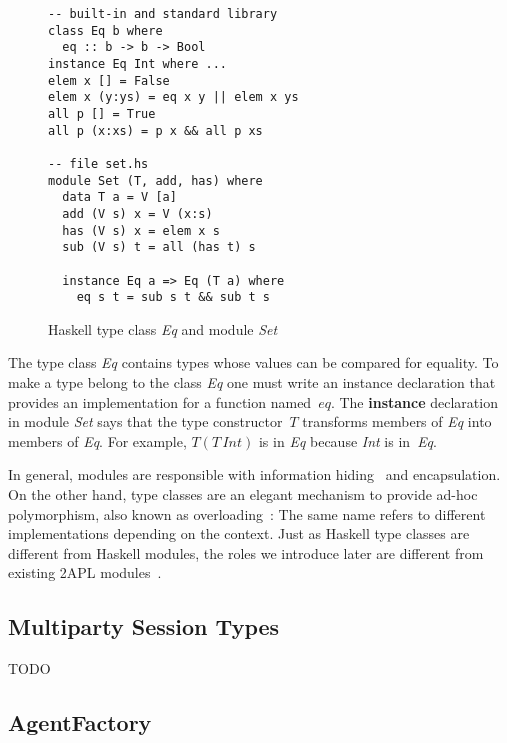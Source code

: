\documentclass[a4paper,12pt,oneside,fleqn]{book} %
\theoremstyle{plain}
\theoremstyle{definition}
\theoremstyle{remark}
\begin{document}
\begin{figure}\footnotesize %
\begin{verbatim}
-- built-in and standard library
class Eq b where
  eq :: b -> b -> Bool
instance Eq Int where ...
elem x [] = False
elem x (y:ys) = eq x y || elem x ys
all p [] = True
all p (x:xs) = p x && all p xs

-- file set.hs
module Set (T, add, has) where
  data T a = V [a]
  add (V s) x = V (x:s)
  has (V s) x = elem x s
  sub (V s) t = all (has t) s

  instance Eq a => Eq (T a) where
    eq s t = sub s t && sub t s
\end{verbatim}
\caption{Haskell type class \textit{Eq} and module \textit{Set}}
\label{fig:haskell}
\end{figure} %


The type class \textit{Eq} contains types whose values can be compared for
equality. To make a type belong to the class \textit{Eq} one must write an
instance declaration that provides an implementation for a function
named~$eq$. The \textbf{instance} declaration in module \textit{Set} says
that the type constructor~$T$ transforms members of \textit{Eq} into
members of \textit{Eq}. For example, $T(T\,\mathit{Int})$ is in \textit{Eq}
because \textit{Int} is in~\textit{Eq}.

In general, modules are responsible with information
hiding~\cite{DBLP:journals/cacm/Parnas72a} and encapsulation.  On the other
hand, type classes are an elegant mechanism to provide ad-hoc polymorphism,
also known as overloading~\cite{DBLP:conf/popl/WadlerB89}: The same name
refers to different implementations depending on the context.  Just as
Haskell type classes are different from Haskell modules, the roles we
introduce later are different from existing 2APL
modules~\cite{dblp:conf/prima/dastanims08}.


\subsection{Multiparty Session Types} %

TODO

\subsection{AgentFactory} %
\end{document}
